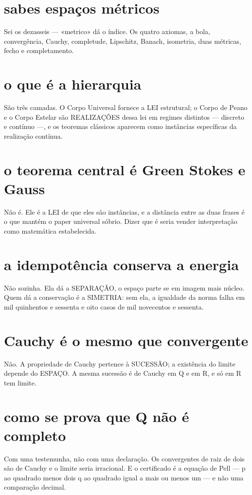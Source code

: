 \documentclass[11pt,a4paper]{article}
\begin{document}
\section{sabes espaços métricos}
Sei os dezasseis — «metrico» dá o índice. Os quatro axiomas, a bola, convergência,
Cauchy, completude, Lipschitz, Banach, isometria, duas métricas, fecho e completamento.

\section{o que é a hierarquia}
São três camadas. O Corpo Universal fornece a LEI estrutural; o Corpo de Peano e o Corpo
Estelar são REALIZAÇÕES dessa lei em regimes distintos — discreto e contínuo —, e os
teoremas clássicos aparecem como instâncias específicas da realização contínua.

\section{o teorema central é Green Stokes e Gauss}
Não é. Ele é a LEI de que eles são instâncias, e a distância entre as duas frases é o que
mantém o paper universal sóbrio. Dizer que é seria vender interpretação como matemática
estabelecida.

\section{a idempotência conserva a energia}
Não sozinha. Ela dá a SEPARAÇÃO, o espaço parte se em imagem mais núcleo. Quem dá a
conservação é a SIMETRIA: sem ela, a igualdade da norma falha em mil quinhentos e sessenta
e oito casos de mil novecentos e sessenta.

\section{Cauchy é o mesmo que convergente}
Não. A propriedade de Cauchy pertence à SUCESSÃO; a existência do limite depende do
ESPAÇO. A mesma sucessão é de Cauchy em Q e em R, e só em R tem limite.

\section{como se prova que Q não é completo}
Com uma testemunha, não com uma declaração. Os convergentes de raiz de dois são de Cauchy
e o limite seria irracional. E o certificado é a equação de Pell — p ao quadrado menos
dois q ao quadrado igual a mais ou menos um — e não uma comparação decimal.
\end{document}
